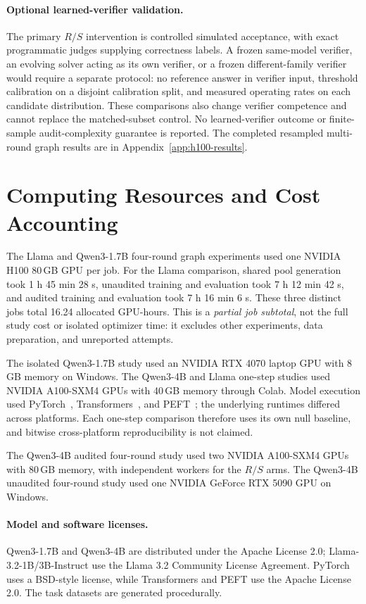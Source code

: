 \paragraph{Optional learned-verifier validation.}
The primary $R/S$ intervention is controlled simulated acceptance, with
exact programmatic judges supplying correctness labels. A frozen same-model
verifier, an evolving solver acting as its own verifier, or a frozen
different-family verifier would require a separate protocol: no reference
answer in verifier input, threshold calibration on a disjoint calibration
split, and measured operating rates on each candidate distribution.
These comparisons also change verifier competence and cannot replace the
matched-subset control. No learned-verifier outcome or finite-sample
audit-complexity guarantee is reported. The completed resampled
multi-round graph results are in Appendix~\ref{app:h100-results}.

\section{Computing Resources and Cost Accounting}
\label{app:cost}

The Llama and Qwen3-1.7B four-round graph experiments used one NVIDIA H100 80\,GB GPU per
job. For the Llama comparison, shared pool generation took 1 h 45 min
28 s, unaudited training and evaluation took 7 h 12 min 42 s, and audited
training and evaluation took 7 h 16 min 6 s. These three distinct jobs
total 16.24 allocated GPU-hours. This is a \emph{partial job subtotal},
not the full study cost or isolated optimizer time: it excludes other
experiments, data preparation, and unreported attempts.

The isolated Qwen3-1.7B study used an NVIDIA RTX 4070 laptop GPU with
8\,GB memory on Windows. The Qwen3-4B and Llama one-step studies used
NVIDIA A100-SXM4 GPUs with 40\,GB memory through Colab. Model execution
used PyTorch~\citep{paszke2019pytorch}, Transformers~\citep{wolf2020transformers},
and PEFT~\citep{peft}; the underlying runtimes differed
across platforms. Each one-step comparison therefore uses its own null
baseline, and bitwise cross-platform reproducibility is not claimed.

The Qwen3-4B audited four-round study used two NVIDIA A100-SXM4 GPUs
with 80\,GB memory, with independent workers for the $R/S$ arms.
The Qwen3-4B unaudited four-round study used one NVIDIA GeForce
RTX 5090 GPU on Windows.

\paragraph{Model and software licenses.}
Qwen3-1.7B and Qwen3-4B are distributed under the Apache License 2.0;
Llama-3.2-1B/3B-Instruct use the Llama 3.2 Community License Agreement.
PyTorch uses a BSD-style license, while Transformers and PEFT use the
Apache License 2.0. The task datasets are generated procedurally.

